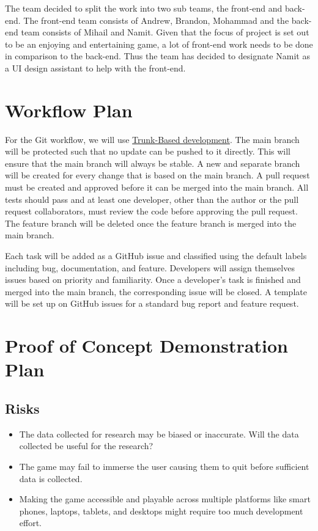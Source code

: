 \documentclass{article}
\begin{document}
The team decided to split the work into two sub teams, the front-end and back-end. The front-end team consists of Andrew, Brandon, Mohammad and the back-end team consists of Mihail and Namit. Given that the focus of project is set out to be an enjoying and entertaining game, a lot of front-end work needs to be done in comparison to the back-end. Thus the team has decided to designate Namit as a UI design assistant to help with the front-end. 

\section{Workflow Plan}
For the Git workflow, we will use \href{https://www.atlassian.com/continuous-delivery/continuous-integration/trunk-based-development}{Trunk-Based development}. The main branch will be protected such that no update can be pushed to it directly. This will ensure that the main branch will always be stable. 
A new and separate branch will be created for every change that is based on the main branch. A pull request must be created and approved before it can be merged into the main branch. All tests should pass and at least one developer, other than the author or the pull request collaborators, must review the code before approving the pull request. The feature branch will be deleted once the feature branch is merged into the main branch.

Each task will be added as a GitHub issue and classified using the default labels including bug, documentation, and feature. Developers will assign themselves issues based on priority and familiarity. Once a developer's task is finished and merged into the main branch, the corresponding issue will be closed. A template will be set up on GitHub issues for a standard bug report and feature request.

\section{Proof of Concept Demonstration Plan}
\subsection{Risks}
\begin{itemize}
    \item The data collected for research may be biased or inaccurate. Will the data collected be useful for the research?
    \item The game may fail to immerse the user causing them to quit before sufficient data is collected.
    \item Making the game accessible and playable across multiple platforms like smart phones, laptops, tablets, and desktops might require too much development effort.
\end{itemize}
\end{document}
